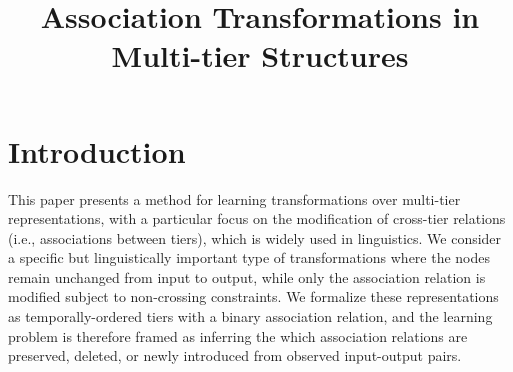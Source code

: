 \documentclass[pmlr]{jmlr}%
\title{Association Transformations in Multi-tier Structures}
\begin{document}
\maketitle



\section{Introduction}
This paper presents a method for learning transformations over multi-tier 
representations, with a particular focus on the modification of cross-tier 
relations (i.e., associations between tiers), which is widely used in 
linguistics. 
We consider a specific but linguistically important type of transformations where
the nodes remain unchanged from input to output, while only the association relation is
modified subject to non-crossing constraints. We formalize these 
representations as temporally-ordered tiers with a binary association 
relation, and the learning problem is
therefore framed as inferring the which association relations are
preserved, deleted, or newly introduced from observed input-output pairs.
\end{document}
